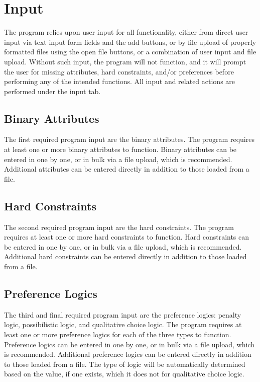 \documentclass[12pt]{report}
\begin{document}
\chapter{Input}
The program relies upon user input for all functionality, either from direct user input via text input form fields and the add buttons, or by file upload of properly formatted files using the open file buttons, or a combination of user input and file upload. Without such input, the program will not function, and it will prompt the user for missing attributes, hard constraints, and/or preferences before performing any of the intended functions. All input and related actions are performed under the input tab.

\section{Binary Attributes}
The first required program input are the binary attributes. The program requires at least one or more binary attributes to function. Binary attributes can be entered in one by one, or in bulk via a file upload, which is recommended. Additional attributes can be entered directly in addition to those loaded from a file.

\section{Hard Constraints}
The second required program input are the hard constraints. The program requires at least one or more hard constraints to function. Hard constraints can be entered in one by one, or in bulk via a file upload, which is recommended. Additional hard constraints can be entered directly in addition to those loaded from a file.

\section{Preference Logics}
The third and final required program input are the preference logics: penalty logic, possibilistic logic, and qualitative choice logic. The program requires at least one or more preference logics for each of the three types to function. Preference logics can be entered in one by one, or in bulk via a file upload, which is recommended. Additional preference logics can be entered directly in addition to those loaded from a file. The type of logic will be automatically determined based on the value, if one exists, which it does not for qualitative choice logic.\\
\end{document}
